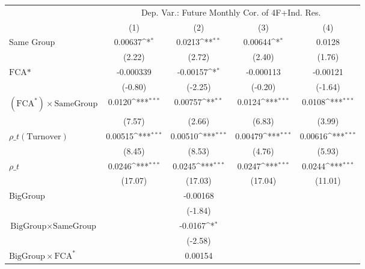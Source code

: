 {
\def\sym#1{\ifmmode^{#1}\else\(^{#1}\)\fi}
\begin{tabular}{l*{4}{c}}
\hline\hline
                &\multicolumn{4}{c}{Dep. Var.: Future Monthly Cor.  of 4F+Ind. Res.}        \\\cmidrule(lr){2-5}
                &\multicolumn{1}{c}{(1)}         &\multicolumn{1}{c}{(2)}         &\multicolumn{1}{c}{(3)}         &\multicolumn{1}{c}{(4)}         \\
\hline
Same Group      &  0.00637\sym{*}  &   0.0213\sym{**} &  0.00644\sym{*}  &   0.0128         \\
                &   (2.22)         &   (2.72)         &   (2.40)         &   (1.76)         \\
[1em]
$ \text{FCA*} $ &-0.000339         & -0.00157\sym{*}  &-0.000113         & -0.00121         \\
                &  (-0.80)         &  (-2.25)         &  (-0.20)         &  (-1.64)         \\
[1em]
 $ (\text{FCA}^*) \times {\text{SameGroup} }  $ &   0.0120\sym{***}&  0.00757\sym{**} &   0.0124\sym{***}&   0.0108\sym{***}\\
                &   (7.57)         &   (2.66)         &   (6.83)         &   (3.99)         \\
[1em]
 $ {\rho\_t(\text{Turnover})} $ &  0.00515\sym{***}&  0.00510\sym{***}&  0.00479\sym{***}&  0.00616\sym{***}\\
                &   (8.45)         &   (8.53)         &   (4.76)         &   (5.93)         \\
[1em]
 $ {\rho\_t} $   &   0.0246\sym{***}&   0.0245\sym{***}&   0.0247\sym{***}&   0.0244\sym{***}\\
                &  (17.07)         &  (17.03)         &  (17.04)         &  (11.01)         \\
[1em]
BigGroup        &                  & -0.00168         &                  &                  \\
                &                  &  (-1.84)         &                  &                  \\
[1em]
$ {\text{BigGroup} } \times {\text{SameGroup} }  $ &                  &  -0.0167\sym{*}  &                  &                  \\
                &                  &  (-2.58)         &                  &                  \\
[1em]
$ {\text{BigGroup} } \times \text{FCA}^*  $ &                  &  0.00154         &                  &                  \\

\end{tabular}}
